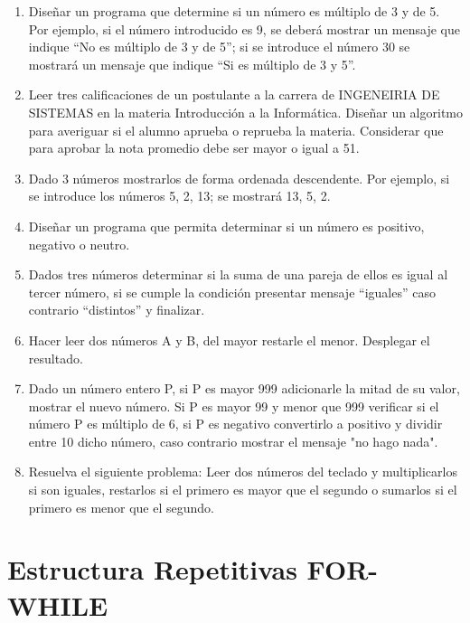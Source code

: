 \documentclass{scrartcl}
\begin{document}
\begin{enumerate}
		\item Diseñar un programa que determine si un número es múltiplo de 3 y de 5. Por ejemplo, si el número introducido es 9, se deberá mostrar un mensaje que indique “No es múltiplo	de 3 y de 5”; si se introduce el número 30 se mostrará un mensaje que indique “Si es múltiplo de 3 y 5”.
		
		\item Leer tres calificaciones de un postulante a la carrera de INGENEIRIA DE SISTEMAS en	la materia Introducción a la Informática. Diseñar un algoritmo para averiguar si el alumno aprueba o reprueba la materia. Considerar que para aprobar la nota promedio debe ser mayor o igual a 51.
		
		\item Dado 3 números mostrarlos de forma ordenada descendente. Por ejemplo, si se
		introduce los números 5, 2, 13; se mostrará 13, 5, 2.
		
		\item Diseñar un programa que permita determinar si un número es positivo, negativo o neutro.
		
		\item Dados tres números determinar si la suma de una pareja de ellos es igual al tercer número, si se cumple la condición presentar mensaje “iguales” caso contrario “distintos” y finalizar.
		
		\item Hacer leer dos números A y B, del mayor restarle el menor. Desplegar el resultado.
		
		\item Dado un número entero P, si P es mayor 999 adicionarle la mitad de su valor, mostrar el nuevo número. Si P es mayor 99 y menor que 999 verificar si el número P es múltiplo de 6, si P es negativo convertirlo a positivo y dividir entre 10 dicho número, caso contrario mostrar el mensaje "no hago nada".
		
		\item Resuelva el siguiente problema: Leer dos números del teclado y multiplicarlos si son iguales, restarlos si el primero es mayor que el segundo o sumarlos si el primero es menor que el segundo.
	\end{enumerate}

\section{Estructura Repetitivas FOR-WHILE}
	
\end{document}

